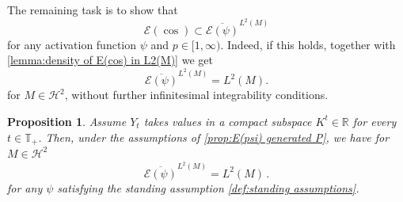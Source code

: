 \documentclass[11pt,a4paper,twoside,openany]{report}
\theoremstyle{plain} %
\newtheorem{proposition}[proposition]{Proposition}
\theoremstyle{definition} %
\theoremstyle{remark} %
\begin{document}
The remaining task is to show that
\begin{equation}
    \mathcal{E}(\cos)\subset \overline{\mathcal{E}(\psi)}^{L^2(M)}
\end{equation}
for any activation function \(\psi\) and \(p\in[1,\infty)\). Indeed, if this holds, together with \cref{lemma:density of E(cos) in L2(M)} we get 
\begin{equation}
    \overline{\mathcal{E}(\psi)}^{L^2(M)}=L^2(M).
\end{equation}
for \(M\in\mathcal{H}^2\), without further infinitesimal integrability conditions. 
\begin{proposition}\label{prop:density of E(psi) in L^2(M)}
    Assume \(Y_t\) takes values in a compact subspace \(K^t\in\mathbb{R}\) for every \(t\in\mathbb{T}_+\). Then, under the assumptions of \cref{prop:E(psi) generated P}, we have for \(M\in\mathcal{H}^2\)
    \begin{equation}
        \overline{\mathcal{E}(\psi)}^{L^2(M)}=L^2(M)\,.
    \end{equation}
    for any \(\psi\) satisfying the standing assumption \cref{def:standing assumptions}.
\end{proposition}
\end{document}
